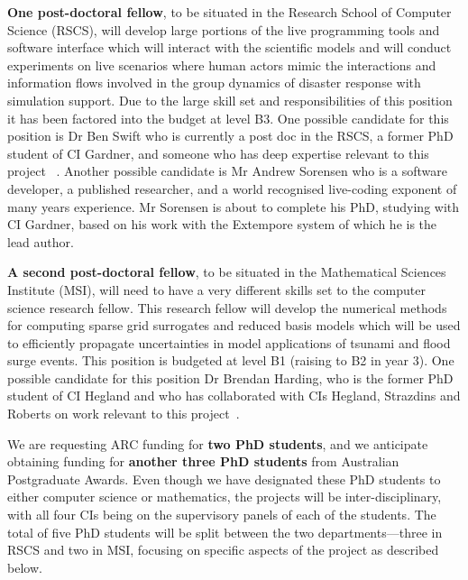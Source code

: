 \iffalse
Both  Dr Debusschere and Dr Jakeman
have offered to host visits from our group to the Livermore and
Albuquerque Sandia Laboratories. We plan to support reciprocal visits
to ANU.
\fi

{\bf One post-doctoral fellow}, to be situated in the Research School
of Computer Science (RSCS), will develop large portions of the live
programming tools and software interface which will interact with the
scientific models and will conduct experiments on live scenarios where
human actors mimic the interactions and information flows involved in
the group dynamics of disaster response with simulation support. Due
to the large skill set and responsibilities of this position it has
been factored into the budget at level B3.  One possible candidate for
this position is Dr Ben Swift who is currently a post doc in the RSCS, a
former PhD student of CI Gardner, and someone who has
deep expertise relevant to this project
~\parencite{martin2015tracking,martin2016intelligent,swiftLive2016,
  swift2013visual,swift2014coding}. Another possible candidate is Mr 
  Andrew Sorensen who is a software developer, a published researcher, and a
   world recognised live-coding exponent of many years experience. 
  Mr Sorensen is about to complete his PhD, studying with CI Gardner, based
  on his work with the Extempore system of which he is the lead author.

{\bf A second post-doctoral fellow}, to be situated in the
Mathematical Sciences Institute (MSI), will need to have a very
different skills set to the computer science research fellow. This
research fellow will develop the numerical methods for computing
sparse grid surrogates and reduced basis models which will be used to
efficiently propagate uncertainties in model applications of tsunami
and flood surge events. This position is budgeted at level B1 (raising
to B2 in year 3).  One possible candidate for this position Dr Brendan Harding, who 
is the former PhD student of CI Hegland and who has
collaborated with CIs Hegland, Strazdins and Roberts on work
relevant to this project~\parencite{Ali11022016, AliEtal2015,
  deBaarHarding2015, HardingHLS2015, sgctalg15}.


We are requesting ARC funding for {\bf two PhD students}, and we anticipate
obtaining funding for {\bf another three PhD students} from Australian Postgraduate
Awards. Even though we have designated these PhD students to either
computer science or mathematics, the projects will be
inter-disciplinary, with all four CIs being on the supervisory panels
of each of the students. The {total of five PhD students} will be split between
the two departments—three in RSCS and two in MSI, focusing on specific
aspects of the project as described below.

